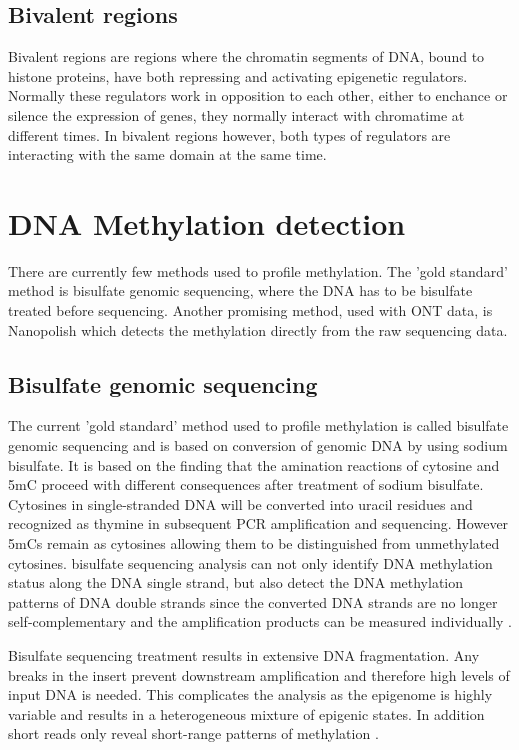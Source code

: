 \subsection{Bivalent regions}
Bivalent regions are regions where the chromatin segments of DNA, bound to histone proteins, have both repressing and activating epigenetic regulators. Normally these regulators work in opposition to each other, either to enchance or silence the expression of genes, they normally interact with chromatime at different times. In bivalent regions however, both types of regulators are interacting with the same domain at the same time. 
 
\section{DNA Methylation detection}
There are currently few methods used to profile methylation. The 'gold standard' method is bisulfate genomic sequencing, where the DNA has to be bisulfate treated before sequencing. Another promising method, used with ONT data, is Nanopolish which detects the methylation directly from the raw sequencing data.

\subsection{Bisulfate genomic sequencing}
\label{sec:background:Bisulfate}
The current 'gold standard' method used to profile methylation is called bisulfate genomic sequencing and is based on conversion of genomic DNA by using sodium bisulfate. It is based on the finding that the amination reactions of cytosine and 5mC proceed with different consequences after treatment of sodium bisulfate. Cytosines in single-stranded DNA will be converted into uracil residues and recognized as thymine in subsequent PCR amplification and sequencing. However 5mCs remain as cytosines allowing them to be distinguished from unmethylated cytosines.   bisulfate sequencing analysis can not only identify DNA methylation status along the DNA single strand, but also detect the DNA methylation patterns of DNA double strands since the converted DNA strands are no longer self-complementary and the amplification products can be measured individually \cite{frommer1992genomic} \cite{li2011dna}.

Bisulfate sequencing treatment results in extensive DNA fragmentation. Any breaks in the insert prevent downstream amplification and therefore high levels of input DNA is needed. This complicates the analysis as the epigenome is highly variable and results in a heterogeneous mixture of epigenic states. In addition short reads only reveal short-range patterns of methylation \cite{miura2012amplification}.

